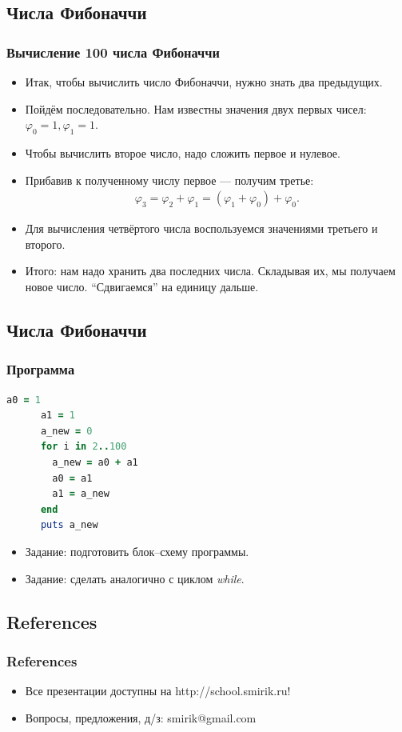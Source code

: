 \documentclass[compress,red]{beamer}
\begin{document}
\subsection{Числа Фибоначчи}
\begin{frame}[fragile]
  \frametitle{Вычисление 100 числа Фибоначчи }
	\begin{itemize}
	  \item Итак, чтобы вычислить число Фибоначчи, нужно знать два предыдущих.
	  \item Пойдём последовательно. Нам известны значения двух первых чисел: $\varphi_0 = 1, \varphi_1 = 1$.
	  \item Чтобы вычислить второе число, надо сложить первое и нулевое.
	  \item Прибавив к полученному числу первое — получим третье:
	    \begin{gather*}
	      \varphi_3 = \varphi_2 + \varphi_1 = (\varphi_1 + \varphi_0) + \varphi_0.
	    \end{gather*}
	  \item Для вычисления четвёртого числа воспользуемся значениями третьего и второго.
	  \item Итого: нам надо хранить два последних числа. Складывая их, мы получаем новое число. ``Сдвигаемся'' на единицу дальше.
  \end{itemize}
\end{frame}

\subsection{Числа Фибоначчи}
\begin{frame}[fragile]
  \frametitle{Программа}
    \begin{lstlisting}[language=ruby,numbersep=2pt,label=ruby12,caption=100 число Фибоначчи]
      a0 = 1
      a1 = 1
      a_new = 0
      for i in 2..100
        a_new = a0 + a1
        a0 = a1
        a1 = a_new
      end
      puts a_new
    \end{lstlisting}
    \begin{itemize}
      \item Задание: подготовить блок--схему программы.
      \item Задание: сделать аналогично с циклом \emph{while}.
    \end{itemize}
\end{frame}

\subsection{References}
\begin{frame}[fragile]
  \frametitle{References}
  \begin{itemize}
    \item Все презентации доступны на http://school.smirik.ru!
    \item Вопросы, предложения, д/з: smirik@gmail.com
  \end{itemize}
\end{frame}
\end{document}
